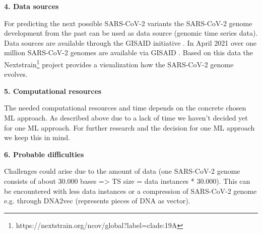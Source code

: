 \textbf{4. Data sources}

For predicting the next possible SARS-CoV-2 variants the SARS-CoV-2 genome develop\-ment from the past can be used as data source (genomic time series data). Data sources are available through the GISAID initiative \cite{Gisaid2021}. In April 2021 over one million SARS-CoV-2 genomes are available via GISAID \cite{Maxmen2021}. Based on this data the Nextstrain\footnote{https://nextstrain.org/ncov/global?label=clade:19A} project provides a visualization how the SARS-CoV-2 genome evolves.


\textbf{5. Computational resources}

The needed computational resources and time depends on the concrete chosen \ac{ML} approach. As described above due to a lack of time we haven't decided yet for one \ac{ML} approach. For further research and the decision for one \ac{ML} approach we keep this in mind.

\textbf{6. Probable difficulties}

Challenges could arise due to the amount of data (one SARS-CoV-2 genome consists of about 30.000 bases => TS size = data instances * 30.000). This can be encountered with less data instances or a compression of SARS-CoV-2 genome e.g. through DNA2vec \cite{Ng2017} (represents pieces of \ac{DNA} as vector).

\newpage
